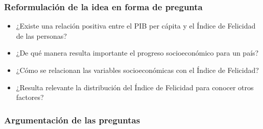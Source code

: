 \subsubsection{Reformulación de la idea en forma de pregunta}

\begin{itemize}
    \item ¿Existe una relación positiva entre el PIB per cápita y el Índice de Felicidad de las personas?
    \item ¿De qué manera resulta importante el progreso socioeconómico para un país?
    \item ¿Cómo se relacionan las variables socioeconómicas con el Índice de Felicidad?
    \item ¿Resulta relevante la distribución del Índice de Felicidad para conocer otros factores?
\end{itemize}

\newpage
\subsubsection{Argumentación de las preguntas}

